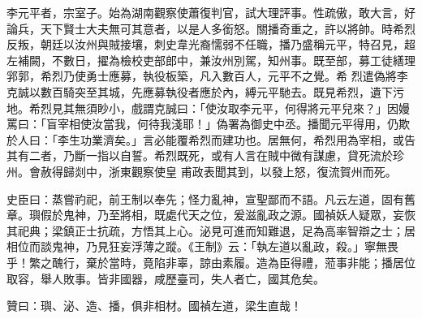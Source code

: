 \begin{pinyinscope}
 李元平者，宗室子。始為湖南觀察使蕭復判官，試大理評事。性疏傲，敢大言，好論兵，天下賢士大夫無可其意者，以是人多銜怒。關播奇重之，許以將帥。時希烈反叛，朝廷以汝州與賊接壤，刺史韋光裔懦弱不任職，播乃盛稱元平，特召見，超左補闕，不數日，擢為檢校吏部郎中，兼汝州別駕，知州事。既至部，募工徒繕理郛郭，希烈乃使勇士應募，執役板築，凡入數百人，元平不之覺。希
 烈遣偽將李克誠以數百騎突至其城，先應募執役者應於內，縛元平馳去。既見希烈，遺下污地。希烈見其無須眇小，戲謂克誠曰：「使汝取李元平，何得將元平兒來？」因嫚罵曰：「盲宰相使汝當我，何待我淺耶！」偽署為御史中丞。播聞元平得用，仍欺於人曰：「李生功業濟矣。」言必能覆希烈而建功也。居無何，希烈用為宰相，或告其有二者，乃斷一指以自誓。希烈既死，或有人言在賊中微有謀慮，貸死流於珍州。會赦得歸剡中，浙東觀察使皇
 甫政表聞其到，以發上怒，復流賀州而死。



 史臣曰：蒸嘗礿祀，前王制以奉先；怪力亂神，宣聖鄙而不語。凡云左道，固有舊章。璵假於鬼神，乃至將相，既處代天之位，爰滋亂政之源。國禎妖人疑眾，妄恢其祀典；梁鎮正士抗疏，方悟其上心。泌見可進而知難退，足為高率智辯之士；居相位而談鬼神，乃見狂妄浮薄之蹤。《王制》云：「執左道以亂政，殺。」寧無畏乎！繁之醜行，棄於當時，竟陷非辜，諒由素履。造為臣得禮，蒞事非能；播居位
 取容，舉人敗事。皆非國器，咸歷臺司，失人者亡，國其危矣。



 贊曰：璵、泌、造、播，俱非相材。國禎左道，梁生直哉！



\end{pinyinscope}